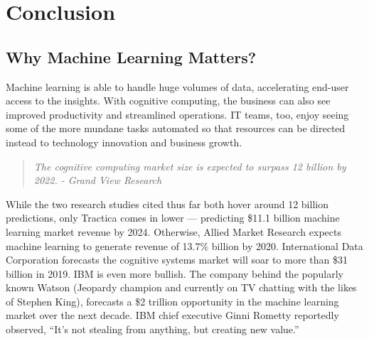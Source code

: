 \chapter{Conclusion}
\section*{Why Machine Learning Matters?}

Machine learning is able to handle huge volumes of data, accelerating end-user access to the insights. With cognitive computing, the business can also see improved productivity and streamlined operations. IT teams, too, enjoy seeing some of the more mundane tasks automated so that resources can be directed instead to technology innovation and business growth.
\begin{framed}
\begin{quote}
{\large \textit{The cognitive computing market size is expected to surpass 12 billion by 2022. - Grand View Research}}
\end{quote}
\end{framed}
While the two research studies cited thus far both hover around 12 billion predictions, only Tractica comes in lower — predicting \$11.1 billion machine learning market revenue by 2024. Otherwise, Allied Market Research expects machine learning to generate revenue of 13.7\% billion by 2020. International Data Corporation forecasts the cognitive systems market will soar to more than \$31 billion in 2019.
IBM is even more bullish. The company behind the popularly known Watson (Jeopardy champion and currently on TV chatting with the likes of Stephen King), forecasts a \$2 trillion opportunity in the machine learning market over the next decade. IBM chief executive Ginni Rometty reportedly observed, “It’s not stealing from anything, but creating new value.”